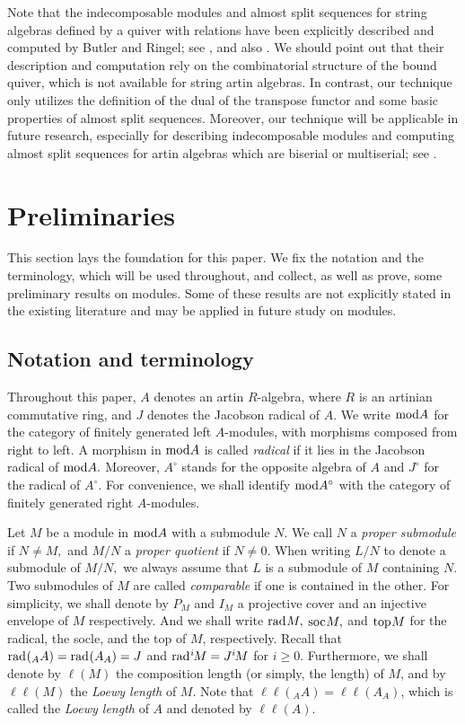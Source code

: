 \documentclass[10pt]{amsart}
\theoremstyle{definition}
\newcommand{\mmod}{{\rm mod}}
\newcommand{\rad}{{\rm rad}\hspace{.5pt}}
\newcommand{\soc}{{\rm soc}\hspace{.5pt}}
\newcommand{\ntop}{{\rm top}\hspace{.5pt}}
\begin{document}
Note that the indecomposable modules and almost split sequences for string algebras defined by a quiver with relations have been explicitly described and computed by Butler and Ringel; see \cite{BuR}, and also \cite{SKW}. We should point out that their description and computation rely on the combinatorial structure of the bound quiver, which is not available for string artin algebras. In contrast, our technique only utilizes the definition of the dual of the transpose functor and some basic properties of almost split sequences. Moreover, our technique will be applicable in future research, especially for describing indecomposable modules and computing almost split sequences for artin algebras which are biserial or multiserial; see \cite{VHW}.

\section{Preliminaries} 

This section lays the foundation for this paper. We fix the notation and the terminology, which will be used throughout, and collect, as well as prove, some preliminary results on modules. Some of these results are not explicitly stated in the existing literature and may be applied in future study on modules.

\subsection{\sc Notation and terminology} Throughout this paper, $A$ denotes an artin $R$-algebra, where $R$ is an artinian commutative ring, and $J$ denotes the Jacobson radical of $A$. We write $\mmod A$ for the category of finitely generated left $A$-modules, with morphisms composed from right to left. A morphism in $\mmod A$ is called {\it radical} if it lies in the Jacobson radical of $\mmod A.$ Moreover, $A^\circ$ stands for the opposite algebra of $A$ and $J^\circ$ for the radical of $A^\circ$. For convenience, we shall identify $\mmod A^\circ$ with the category of finitely generated right $A$-modules.

Let $M$ be a module in $\mmod A$ with a submodule $N$. We call $N$ a {\it proper submodule} if $N\ne M,$ and $M/N$ a {\it proper quotient} if $N\ne 0$. 
When writing $L/N$ to denote a submodule of $M/N,$ we always assume that $L$ is a submodule of $M$ containing $N$. Two submodules of $M$ are called {\it comparable} if one is contained in the other. 
For simplicity, we shall denote by $P_M$ and $I_M$ a projective cover and an injective envelope of $M$ respectively. And we shall write $\rad M,$ $\soc M,$ and $\ntop M$ for the radical, the socle, and the top of $M$, respectively. Recall that $\rad(_AA)=\rad(A_A)=J$ and $\rad^i\hspace{-1pt}M=J^i\hspace{-1pt}M$ for $i\ge 0$. Furthermore, we shall denote by $\ell(M)$ the composition length (or simply, the length) of $M$, and by $\ell\ell(M)$ the {\it Loewy length} of $M.$ %
Note that $\ell\ell(_AA)=\ell\ell(A_A)$, which is called the {\it Loewy length} of $A$ and denoted by $\ell\ell(A)$. 
\end{document}
